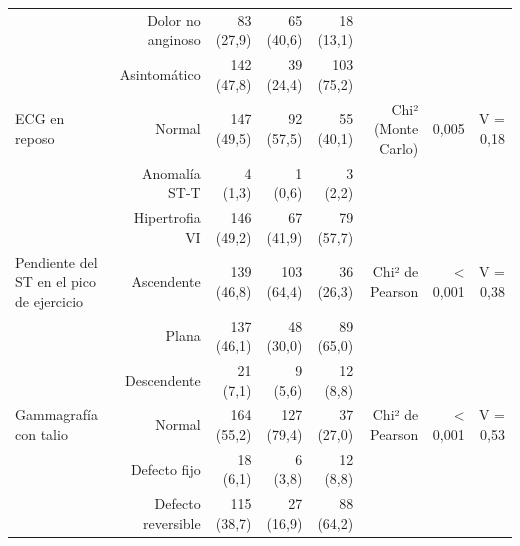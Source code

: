 \begin{table}[H]
\begin{tabular}{lrrrrrrr}
 & Dolor no anginoso & 83 (27,9) & 65 (40,6) & 18 (13,1) &  &  &  \\
 & Asintomático & 142 (47,8) & 39 (24,4) & 103 (75,2) &  &  &  \\
ECG en reposo & Normal & 147 (49,5) & 92 (57,5) & 55 (40,1) & Chi² (Monte Carlo) & 0,005 & V = 0,18 \\
 & Anomalía ST-T & 4 (1,3) & 1 (0,6) & 3 (2,2) &  &  &  \\
 & Hipertrofia VI & 146 (49,2) & 67 (41,9) & 79 (57,7) &  &  &  \\
Pendiente del ST en el pico de ejercicio & Ascendente & 139 (46,8) & 103 (64,4) & 36 (26,3) & Chi² de Pearson & < 0,001 & V = 0,38 \\
 & Plana & 137 (46,1) & 48 (30,0) & 89 (65,0) &  &  &  \\
 & Descendente & 21 (7,1) & 9 (5,6) & 12 (8,8) &  &  &  \\
Gammagrafía con talio & Normal & 164 (55,2) & 127 (79,4) & 37 (27,0) & Chi² de Pearson & < 0,001 & V = 0,53 \\
 & Defecto fijo & 18 (6,1) & 6 (3,8) & 12 (8,8) &  &  &  \\
 & Defecto reversible & 115 (38,7) & 27 (16,9) & 88 (64,2) &  &  &  \\
\bottomrule
\end{tabular}
\end{table}
